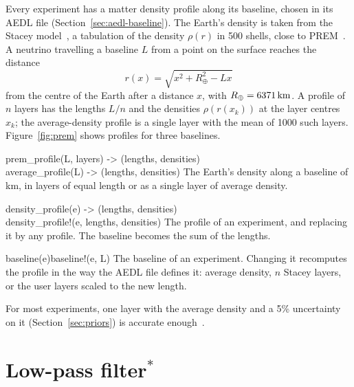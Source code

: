 Every experiment has a matter density profile along its baseline, chosen in
its AEDL file (Section~\ref{sec:aedl-baseline}). The Earth's density is taken
from the Stacey model~\cite{Stacey}, a tabulation of the density
$\rho(r)$ in 500 shells, close to PREM~\cite{PREM}. A neutrino travelling a
baseline $L$ from a point on the surface reaches the distance
\begin{equation}
r(x) = \sqrt{x^2 + R_\oplus^2 - Lx}
\end{equation}
from the centre of the Earth after a distance $x$, with $R_\oplus=6371\,\mathrm{km}$. A profile of $n$
layers has the lengths $L/n$ and the densities $\rho(r(x_k))$ at the layer
centres $x_k$; the average-density profile is a single layer with the mean of
1000 such layers. Figure~\ref{fig:prem} shows profiles for three baselines.
\begin{apifun}{prem\_profile(L, layers) -> (lengths, densities)\\
average\_profile(L) -> (lengths, densities)}
The Earth's density along a baseline of  km, in  layers of
equal length or as a single layer of average density.
\end{apifun}
\begin{apifun}{density\_profile(e) -> (lengths, densities)\\
density\_profile!(e, lengths, densities)}
The profile of an experiment, and replacing it by any profile. The baseline
becomes the sum of the lengths.
\end{apifun}
\begin{apifun}{baseline(e)\qquad baseline!(e, L)}
The baseline of an experiment. Changing it recomputes the profile in the way
the AEDL file defines it: average density, $n$ Stacey layers, or the user
layers scaled to the new length.
\end{apifun}

\noindent For most experiments, one layer with the average density and a 5\%
uncertainty on it (Section~\ref{sec:priors}) is accurate enough~\cite{Huber:2002mx}.

\section{Low-pass filter\texorpdfstring{$^\ast$}{*}}\label{sec:filter}

